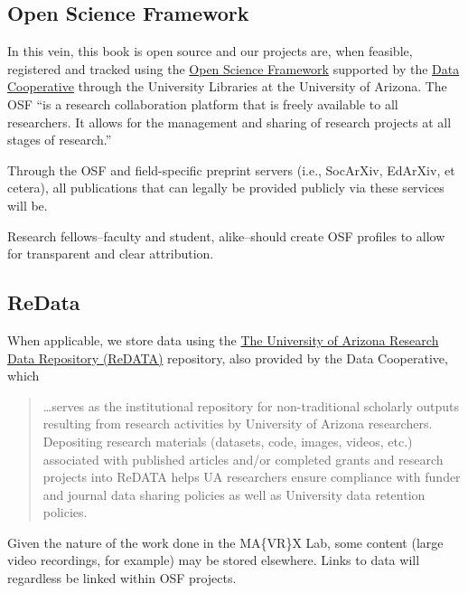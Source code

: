 \documentclass[]{tufte-book}
\begin{document}
\hypertarget{open-science-framework}{%
\subsection{Open Science Framework}\label{open-science-framework}}

In this vein, this book is open source and our projects are, when feasible, registered and tracked using the \href{https://osf.io}{Open Science Framework} supported by the \href{https://data.library.arizona.edu/data-management/services/open-science-framework-osf}{Data Cooperative} through the University Libraries at the University of Arizona. The OSF ``is a research collaboration platform that is freely available to all researchers. It allows for the management and sharing of research projects at all stages of research.''

Through the OSF and field-specific preprint servers (i.e., SocArXiv, EdArXiv, et cetera), all publications that can legally be provided publicly via these services will be.

Research fellows--faculty and student, alike--should create OSF profiles to allow for transparent and clear attribution.

\hypertarget{redata}{%
\subsection{ReData}\label{redata}}

When applicable, we store data using the \href{https://data.library.arizona.edu/data-management/services/research-data-repository-redata}{The University of Arizona Research Data Repository (ReDATA)} repository, also provided by the Data Cooperative, which

\begin{quote}
\ldots serves as the institutional repository for non-traditional scholarly outputs resulting from research activities by University of Arizona researchers. Depositing research materials (datasets, code, images, videos, etc.) associated with published articles and/or completed grants and research projects into ReDATA helps UA researchers ensure compliance with funder and journal data sharing policies as well as University data retention policies.
\end{quote}

Given the nature of the work done in the MA\{VR\}X Lab, some content (large video recordings, for example) may be stored elsewhere. Links to data will regardless be linked within OSF projects.
\end{document}
